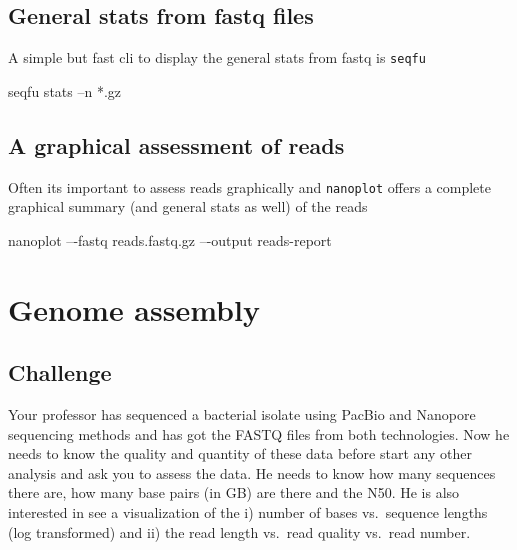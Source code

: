 \documentclass[
  letterpaper,
]{scrbook}
\newenvironment{Shaded}{\begin{snugshade}}{\end{snugshade}}
\newcommand{\ExtensionTok}[1]{\textcolor[rgb]{0.00,0.46,0.62}{#1}}
\newcommand{\NormalTok}[1]{\textcolor[rgb]{0.00,0.46,0.62}{#1}}
\newcommand{\PreprocessorTok}[1]{\textcolor[rgb]{0.68,0.00,0.00}{#1}}
\begin{document}
\hypertarget{general-stats-from-fastq-files}{%
\section*{General stats from fastq
files}\label{general-stats-from-fastq-files}}

A simple but fast cli to display the general stats from fastq is
\texttt{seqfu}

\begin{Shaded}
\begin{Highlighting}[]
\ExtensionTok{seqfu}\NormalTok{ stats –n }\PreprocessorTok{*}\NormalTok{.gz}
\end{Highlighting}
\end{Shaded}

\hypertarget{a-graphical-assessment-of-reads}{%
\section*{A graphical assessment of
reads}\label{a-graphical-assessment-of-reads}}

Often its important to assess reads graphically and \texttt{nanoplot}
offers a complete graphical summary (and general stats as well) of the
reads

\begin{Shaded}
\begin{Highlighting}[]
\ExtensionTok{nanoplot}\NormalTok{ –{-}fastq reads.fastq.gz –{-}output reads{-}report}
\end{Highlighting}
\end{Shaded}

\hypertarget{genome-assembly}{%
\chapter{Genome assembly}\label{genome-assembly}}

\hypertarget{challenge-5}{%
\section*{Challenge}\label{challenge-5}}

Your professor has sequenced a bacterial isolate using PacBio and
Nanopore sequencing methods and has got the FASTQ files from both
technologies. Now he needs to know the quality and quantity of these
data before start any other analysis and ask you to assess the data. He
needs to know how many sequences there are, how many base pairs (in GB)
are there and the N50. He is also interested in see a visualization of
the i) number of bases vs.~sequence lengths (log transformed) and ii)
the read length vs.~read quality vs.~read number.
\end{document}
